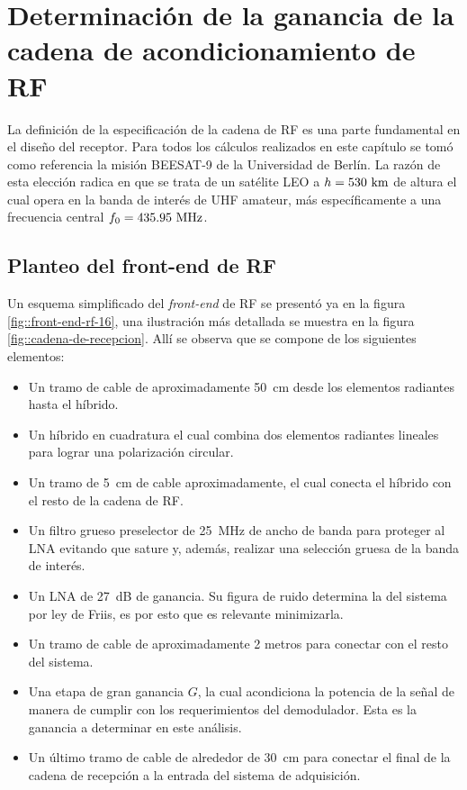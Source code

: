 \documentclass[../../main.tex]{subfiles}
\begin{document}
\graphicspath{{./figures}}
\chapter{Determinación de la ganancia de la cadena de acondicionamiento de RF}

La definición de la especificación de la cadena de RF es una parte fundamental en el diseño del receptor. 
Para todos los cálculos realizados en este capítulo se tomó como referencia la misión BEESAT-9 \cite{BEESAT-9} de la Universidad de Berlín. 
La razón de esta elección radica en que se trata de un satélite LEO a $h = 530~\textrm{km}$ de altura el cual opera en la banda de interés de UHF amateur, más específicamente a una frecuencia central $f_0 = 435.95~\textrm{MHz}$.

\section{Planteo del front-end de RF}
Un esquema simplificado del \textit{front-end} de RF se presentó ya en la figura \ref{fig::front-end-rf-16}, una ilustración más detallada  se muestra en la figura \ref{fig::cadena-de-recepcion}. Allí se observa que se compone de los siguientes elementos:
\begin{itemize}
    \item Un tramo de cable de aproximadamente 50~cm desde los elementos radiantes hasta el híbrido.
    \item Un híbrido en cuadratura el cual combina dos elementos radiantes lineales para lograr una polarización circular.
    \item Un tramo de 5~cm de cable aproximadamente, el cual conecta el híbrido con el resto de la cadena de RF.
    \item Un filtro grueso preselector de 25~MHz de ancho de banda para proteger al LNA evitando que sature y, además, realizar una selección gruesa de la banda de interés.
    \item Un LNA de 27~dB de ganancia. Su figura de ruido determina la del sistema por ley de Friis, es por esto que es relevante minimizarla.
    \item Un tramo de cable de aproximadamente 2 metros para conectar con el resto del sistema.
    \item Una etapa de gran ganancia $G$, la cual acondiciona la potencia de la señal de manera de cumplir con los requerimientos del demodulador. Esta es la ganancia a determinar en este análisis.
    \item Un último tramo de cable de alrededor de 30~cm para conectar el final de la cadena de recepción a la entrada del sistema de adquisición.
\end{itemize}
\end{document}
